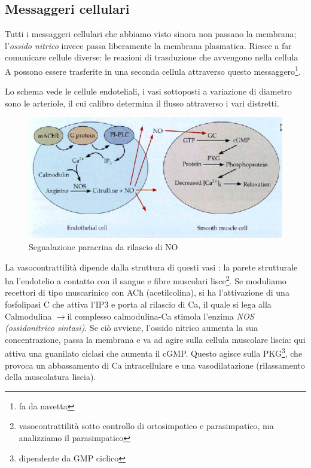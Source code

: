 \documentclass[a4paper,12pt]{article}
\newcommand{\lfreccia}{\ensuremath{\longrightarrow}}
\begin{document}
\subsection{Messaggeri cellulari}
Tutti i messaggeri cellulari che abbiamo visto sinora non passano la membrana; l'\emph{ossido nitrico} invece passa liberamente la membrana plasmatica. Riesce a far comunicare cellule diverse: le reazioni di trasduzione che avvengono nella cellula A possono essere trasferite in una seconda cellula attraverso questo messaggero\footnote{fa da navetta}.

Lo schema vede le cellule endoteliali, i vasi sottoposti a variazione di diametro sono le arteriole, il cui calibro determina il flusso attraverso i vari distretti.

\begin{figure}[H]
\centering
\includegraphics[scale=0.4]{immagine/endoteliali.jpg}
\caption{Segnalazione paracrina da rilascio di NO}
\end{figure}

La vasocontrattilità dipende dalla struttura di questi vasi : la parete strutturale ha l'endotelio a contatto con il sangue e fibre muscolari lisce\footnote{vasocontrattilità sotto controllo di ortosimpatico e parasimpatico, ma analizziamo il parasimpatico}. Se moduliamo recettori di tipo muscarinico con ACh (acetilcolina), si ha l'attivazione di una fosfolipasi C che attiva l'IP3 e porta al rilascio di Ca, il quale si lega alla Calmodulina \lfreccia il complesso calmodulina-Ca stimola l'enzima \emph{NOS (ossidonitrico sintasi)}. Se ciò avviene, l'ossido nitrico aumenta la sua concentrazione, passa la membrana e va ad agire sulla cellula muscolare liscia: qui attiva una guanilato ciclasi che aumenta il cGMP. Questo agisce sulla PKG\footnote{dipendente da GMP ciclico}, che provoca un abbassamento di Ca intracellulare e una vasodilatazione (rilassamento della muscolatura liscia).
\end{document}
